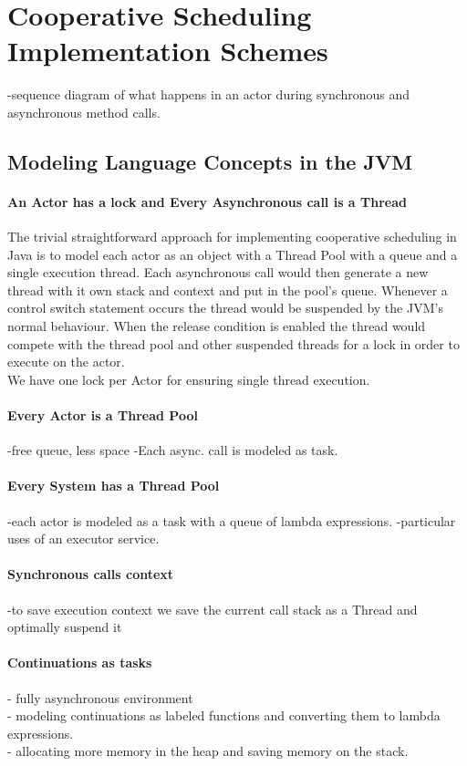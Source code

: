 \section{Cooperative Scheduling Implementation Schemes}

-sequence diagram of what happens in an actor during synchronous and asynchronous method calls.

\subsection{Modeling Language Concepts in the JVM}
\paragraph{An Actor has a lock and Every Asynchronous call is a Thread}
The trivial straightforward approach for implementing cooperative scheduling in Java is to model each actor as an object with a Thread Pool with a queue and a single execution thread. Each asynchronous call would then generate a new thread with it own stack and context and put in the pool's queue. Whenever a control switch statement occurs the thread would be suspended by the JVM's normal behaviour. When the release condition is enabled the thread would compete with the thread pool and other suspended threads for a lock in order to execute on the actor. \\
We have one lock per Actor for ensuring single thread execution.

\paragraph{Every Actor is a Thread Pool}
-free queue, less space
-Each async. call is modeled as task.

\paragraph{Every System has a Thread Pool}
-each actor is modeled as a task with a queue of lambda expressions.
-particular uses of an executor service.

\paragraph{Synchronous calls context}
-to save execution context we save the current call stack as a Thread and optimally suspend it

\paragraph{Continuations as tasks}
- fully asynchronous environment\\
- modeling continuations as labeled functions and converting them to lambda expressions.\\
- allocating more memory in the heap and saving memory on the stack.\\

